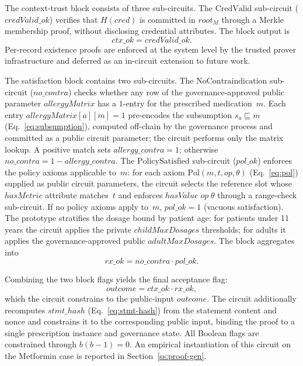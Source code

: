 \documentclass[journal]{IEEEtran}
\begin{document}
The context-trust block consists of three sub-circuits.
The $\mathrm{CredValid}$ sub-circuit
($\mathit{credValid\_ok}$) verifies that $H(\mathit{cred})$ is
committed in $\mathit{root}_M$ through a Merkle membership
proof, without disclosing credential attributes.
The block output is
\begin{equation}
\mathit{ctx\_ok} = \mathit{credValid\_ok}.
\label{eq:ctx-flag}
\end{equation}
Per-record existence proofs are enforced at the system level
by the trusted prover infrastructure and deferred as an
in-circuit extension to future work.

The satisfaction block contains two sub-circuits.
The $\mathrm{NoContraindication}$ sub-circuit
($\mathit{no\_contra}$) checks whether any row of the
governance-approved public parameter $\mathit{allergyMatrix}$
has a $1$-entry for the prescribed medication~$m$.
Each entry $\mathit{allergyMatrix}[a][m]{=}1$ pre-encodes the
subsumption $s_a \sqsubseteq m$ (Eq.~\ref{eq:subsumption}),
computed off-chain by the governance process and committed as a
public circuit parameter; the circuit performs only the matrix lookup.
A positive match sets $\mathit{allergy\_contra}=1$;
otherwise $\mathit{no\_contra} = 1 - \mathit{allergy\_contra}$.
The $\mathrm{PolicySatisfied}$ sub-circuit
($\mathit{pol\_ok}$) enforces the policy axioms applicable
to~$m$: for each axiom
$\mathrm{Pol}(m,t,\mathit{op},\theta)$ (Eq.~\ref{eq:pol})
supplied as public circuit parameters, the circuit selects the
reference slot whose $\mathit{hasMetric}$ attribute matches~$t$
and enforces
$\mathit{hasValue}\;\mathit{op}\;\theta$ through a range-check
sub-circuit.
If no policy axioms apply to~$m$, $\mathit{pol\_ok}=1$
(vacuous satisfaction).
The prototype stratifies the dosage bound by patient age:
for patients under 11 years the circuit applies the private
$\mathit{childMaxDosages}$ thresholds; for adults it applies
the governance-approved public $\mathit{adultMaxDosages}$.
The block aggregates into
\begin{equation}
\mathit{rx\_ok}
=
\mathit{no\_contra}
\cdot
\mathit{pol\_ok}.
\label{eq:rx-flag}
\end{equation}

Combining the two block flags yields the final acceptance
flag:
\begin{equation}
\mathit{outcome}
=
\mathit{ctx\_ok}
\cdot
\mathit{rx\_ok},
\label{eq:outcome}
\end{equation}
which the circuit constrains to the public-input
$\mathit{outcome}$.
The circuit additionally recomputes $\mathit{stmt\_hash}$
(Eq.~\ref{eq:stmt-hash}) from the statement content and nonce
and constrains it to the corresponding public input, binding
the proof to a single prescription instance and governance
state.
All Boolean flags are constrained through $b(b-1)=0$.
An empirical instantiation of this circuit on the Metformin
case is reported in Section~\ref{ss:proof-gen}.
\end{document}
